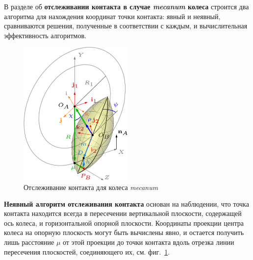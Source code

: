 В разделе об \textbf{отслеживании контакта в случае \textit{mecanum} колеса} строится два алгоритма для нахождения координат точки контакта: явный и неявный, сравниваются решения, полученные в соответствии с каждым, и вычислительная эффективность алгоритмов.

%

\begin{figure}[H]
    \centering
    \includegraphics[width=0.5\textwidth]{./content/pic/asy/pic_mecanum.png}
    \caption{Отслеживание контакта для колеса \textit{mecanum}}
    \label{fig:mecanum}
\end{figure}

\textbf{Неявный алгоритм отслеживания контакта} основан на наблюдении, что точка контакта находится всегда в пересечении вертикальной плоскости, содержащей ось колеса, и горизонтальной опорной плоскости. Координаты проекции центра колеса на опорную плоскость могут быть вычислены явно, и остается получить лишь расстояние $\mu$ от этой проекции до точки контакта вдоль отрезка линии пересечения плоскостей, соединяющего их, см. фиг.~\ref{fig:mecanum}.

